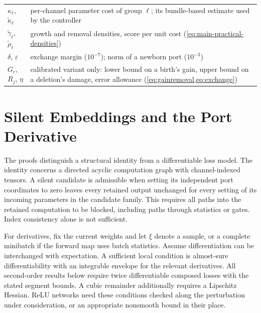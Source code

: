 \documentclass[10pt]{article}
\theoremstyle{paper}
\begin{document}
\begin{table}[h]
\begin{tabular}{@{}p{}p{}@{}}
$\kappa_\ell$, $\widetilde\kappa_\ell$ & per-channel parameter cost of group $\ell$; its bundle-based estimate used by the controller \\
$\widetilde\gamma_\ell$, $\widetilde\rho_\ell$ & growth and removal densities, score per unit cost (\cref{eq:main-practical-densities}) \\
$\delta$, $\varepsilon$ & exchange margin ($10^{-7}$); norm of a newborn port ($10^{-3}$) \\
$G_c$, $R_j$, $\eta$ & calibrated variant only: lower bound on a birth's gain, upper bound on a deletion's damage, error allowance (\cref{eq:gainremoval,eq:exchange}) \\
\bottomrule
\end{tabular}
\end{table}
\clearpage

\section{Silent Embeddings and the Port Derivative}
\label{app:embedding}
The proofs distinguish a structural identity from a differentiable loss model. The identity concerns a directed acyclic computation graph with channel-indexed tensors. A silent candidate is admissible when setting its independent port coordinates to zero leaves every retained output unchanged for every setting of its incoming parameters in the candidate family. This requires all paths into the retained computation to be blocked, including paths through statistics or gates. Index consistency alone is not sufficient.

For derivatives, fix the current weights and let $\xi$ denote a sample, or a complete minibatch if the forward map uses batch statistics. Assume differentiation can be interchanged with expectation. A sufficient local condition is almost-sure differentiability with an integrable envelope for the relevant derivatives. All second-order results below require twice differentiable composed losses with the stated segment bounds. A cubic remainder additionally requires a Lipschitz Hessian. ReLU networks need these conditions checked along the perturbation under consideration, or an appropriate nonsmooth bound in their place.
\end{document}
